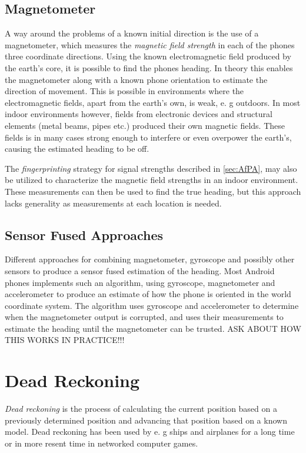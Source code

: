 \documentclass{LTHthesis}
\begin{document}
\subsection{Magnetometer}
%
A way around the problems of a known initial direction is the use of a magnetometer, which measures the \emph{magnetic field strength} in each of the phones three coordinate directions. Using the known electromagnetic field produced by the earth's core, it is possible to find the phones heading. In theory this enables the magnetometer along with a known phone orientation to estimate the direction of movement. This is possible in environments where the electromagnetic fields, apart from the earth's own, is weak, e. g outdoors. In most indoor environments however, fields from electronic devices and structural elements (metal beams, pipes etc.) produced their own magnetic fields. These fields is in many cases strong enough to interfere or even overpower the earth's, causing the estimated heading to be off. 

The \emph{fingerprinting} strategy for signal strengths described in \ref{sec:AfPA}, may also be utilized to characterize the magnetic field strengths in an indoor environment. These measurements can then be used to find the true heading, but this approach lacks generality as measurements at each location is needed.  
%
\subsection{Sensor Fused Approaches}
%
Different approaches for combining magnetometer, gyroscope and possibly other sensors to produce a sensor fused estimation of the heading. Most Android phones implements such an algorithm, using gyroscope, magnetometer and accelerometer to produce an estimate of how the phone is oriented in the world coordinate system. The algorithm uses gyroscope and accelerometer to determine when the magnetometer output is corrupted, and uses their measurements to estimate the heading until the magnetometer can be trusted. ASK ABOUT HOW THIS WORKS IN PRACTICE!!!
%
\section{Dead Reckoning}
%
\emph{Dead reckoning} is the process of calculating the current position based on a previously determined position and advancing that position based on a known model. Dead reckoning has been used by e. g ships and airplanes for a long time or in more resent time in networked computer games. 
\end{document}
